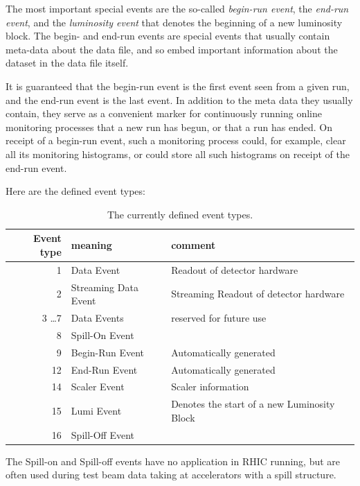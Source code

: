 \documentclass{article}[11pt]
\begin{document}
The most important special events are the so-called \emph{begin-run
  event}, the \emph{end-run event}, and the \emph{luminosity event} that
denotes the beginning of a new luminosity block. The begin- and
end-run events are special events that usually contain meta-data about
the data file, and so embed important information about the dataset in
the data file itself.

It is guaranteed that the begin-run event is the first event seen from
a given run, and the end-run event is the last event. In addition to
the meta data they usually contain, they serve as a convenient marker
for continuously running online monitoring processes that a new run has
begun, or that a run has ended. On receipt of a begin-run event, such
a monitoring process could, for example, clear all its monitoring
histograms, or could store all such histograms on receipt of the
end-run event.


Here are the defined event types:
     
\begin{table}[hbt]
  \caption { \label{event_types} The currently defined event types.}
\begin{center}
\begin{tabular}{|r|l|l|}
\hline
Event type & meaning & comment \\
\hline
\hline
    1 & Data Event &  Readout of detector hardware\\ \hline
    2 & Streaming Data Event &  Streaming Readout of detector hardware\\ \hline
    3 \dots 7 & Data Events & reserved for future use \\ \hline
    8  & Spill-On Event &  \\ \hline
    9  & Begin-Run Event & Automatically generated \\ \hline
    12 & End-Run Event & Automatically generated   \\ \hline
    14 & Scaler Event  &  Scaler information \\ \hline
    15 & Lumi Event  &  Denotes the start of a new Luminosity Block \\ \hline
    16 & Spill-Off Event  &  \\ \hline
\hline
\end{tabular}
\end{center}
\end{table}

The Spill-on and Spill-off events have no application in RHIC running,
but are often used during test beam data taking at accelerators with a
spill structure.
\end{document}
